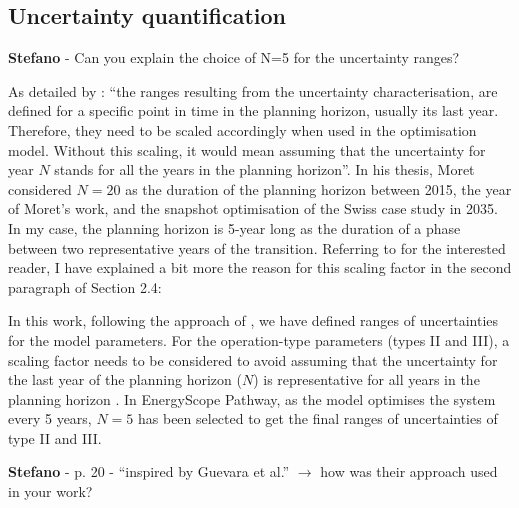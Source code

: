 \documentclass[12pt,a4paper]{article}
\begin{document}
\subsection{Uncertainty quantification}
\label{methodo_UQ}

\begin{mdframed}[style=comment] %
{\color{orange} \textbf{Stefano}} - Can you explain the choice of N=5 for the uncertainty ranges?
\end{mdframed}

\noindent As detailed by \citet{Moret2017PhDThesis}: ``the ranges resulting from the uncertainty characterisation, are defined for a specific point in time in the planning horizon, usually its last year. Therefore, they need to be scaled accordingly when used in the optimisation model. Without this scaling, it would mean assuming that the uncertainty for year $N$ stands for all the years in the planning horizon''. In his thesis, Moret considered $N=20$ as the duration of the planning horizon between 2015, the year of Moret's work, and the snapshot optimisation of the Swiss case study in 2035. In my case, the planning horizon is 5-year long as the duration of a phase between two representative years of the transition. Referring to \citet{Moret2017PhDThesis} for the interested reader, I have explained a bit more the reason for this scaling factor {\color{blue}in the second paragraph of Section 2.4}:

\begin{mdframed}[style=manuscript] %
In this work, following the approach of \citet{Moret2017PhDThesis}, we have defined ranges of uncertainties for the model parameters.  For the operation-type parameters (types II and III), a scaling factor needs to be considered to avoid assuming that the uncertainty for the last year of the planning horizon ($N$) is representative for all years in the planning horizon \citet{Moret2017PhDThesis}. In EnergyScope Pathway, as the model optimises the system every 5 years, $N=5$ has been selected to get the final ranges of uncertainties of type II and III. 
\end{mdframed}

\begin{mdframed}[style=comment] %
{\color{orange} \textbf{Stefano}} - p. 20 - ``inspired by Guevara et al.'' $\rightarrow$ how was their approach used in your work?
\end{mdframed}
\end{document}
